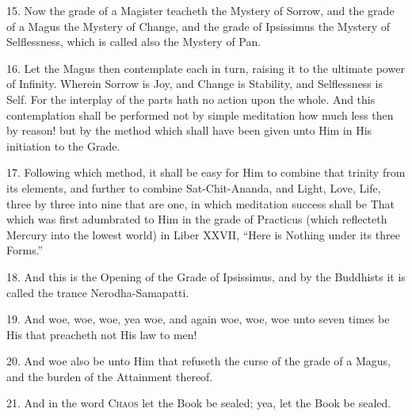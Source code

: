 15. Now the grade of a Magister teacheth the Mystery of Sorrow, and the grade of a Magus the Mystery of Change, and the grade of Ipsissimus the Mystery of Selflessness, which is called also the Mystery of Pan.

16. Let the Magus then contemplate each in turn, raising it to the ultimate power of Infinity. Wherein Sorrow is Joy, and Change is Stability, and Selflessness is Self. For the interplay of the parts hath no action upon the whole. And this contemplation shall be performed not by simple meditation \textemdash{} how much less then by reason! but by the method which shall have been given unto Him in His initiation to the Grade.

17. Following which method, it shall be easy for Him to combine that trinity from its elements, and further to combine Sat-Chit-Ananda, and Light, Love, Life, three by three into nine that are one, in which meditation success shall be That which was first adumbrated to Him in the grade of Practicus (which reflecteth Mercury into the lowest world) in Liber XXVII, \enquote{Here is Nothing under its three Forms.}

18. And this is the Opening of the Grade of Ipsissimus, and by the Buddhists it is called the trance Nerodha-Samapatti.

19. And woe, woe, woe, yea woe, and again woe, woe, woe unto seven times be His that preacheth not His law to men!

20. And woe also be unto Him that refuseth the curse of the grade of a Magus, and the burden of the Attainment thereof.

21. And in the word \textsc{Chaos} let the Book be sealed; yea, let the Book be sealed.
